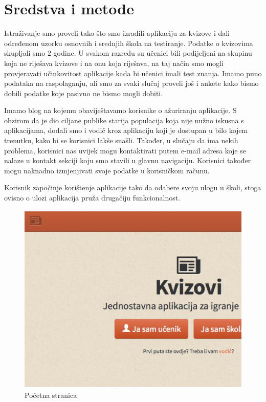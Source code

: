 \documentclass{scrreprt}
\begin{document}
\chapter{Sredstva i metode}

Istraživanje smo proveli tako što smo izradili aplikaciju za kvizove i dali
određenom uzorku osnovnih i srednjih škola na testiranje. Podatke o kvizovima
skupljali smo 2 godine. U svakom razredu su učenici bili podijeljeni na skupinu
koja ne riješava kvizove i na onu koja riješava, na taj način smo mogli
provjeravati učinkovitost aplikacije kada bi učenici imali test znanja. Imamo
puno podataka na raspolaganju, ali smo za svaki slučaj proveli još i ankete kako
bismo dobili podatke koje pasivno ne bismo mogli dobiti.

Imamo blog na kojemu obaviještavamo korisnike o ažuriranju aplikacije. S obzirom
da je dio ciljane publike starija populacija koja nije nužno iskusna s
aplikacijama, dodali smo i vodič kroz aplikaciju koji je dostupan u bilo kojem
trenutku, kako bi se korisnici lakše snašli. Također, u slučaju da ima nekih
problema, korisnici nas uvijek mogu kontaktirati putem e-mail adresa koje se
nalaze u kontakt sekciji koju smo stavili u glavnu navigaciju. Korisnici također
mogu naknadno izmjenjivati svoje podatke u korisničkom računu.

Korisnik započinje korištenje aplikacije tako da odabere svoju ulogu u školi,
stoga ovisno o ulozi aplikacija pruža drugačiju funkcionalnost.

\begin{figure}[H]
  \includegraphics[width=\textwidth, clip=true, trim=0 7cm 0 0, fbox]{home}
  \caption{Početna stranica}
\end{figure}
\end{document}
